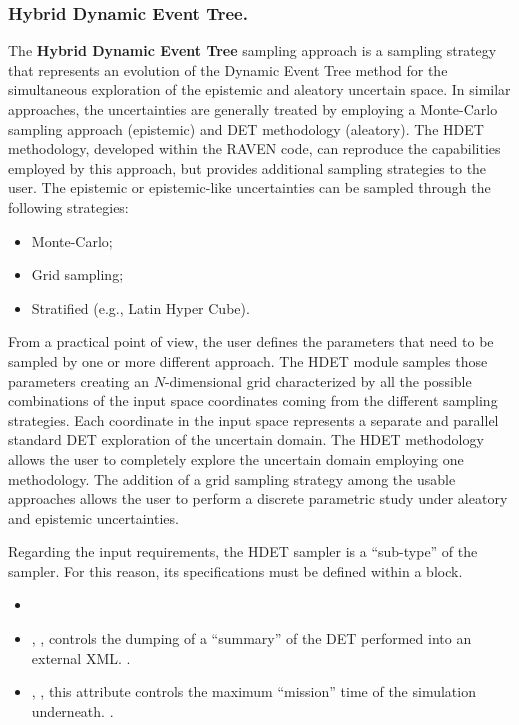 \subsubsection{Hybrid Dynamic Event Tree.}
\label{subsubsubsec:HDET}
The \textbf{Hybrid Dynamic Event Tree} sampling approach is a sampling strategy
that represents an evolution of the Dynamic Event Tree method for the
simultaneous exploration of the epistemic and aleatory uncertain space.
%
In similar approaches, the uncertainties are generally treated by employing a
Monte-Carlo sampling approach (epistemic) and DET methodology (aleatory).
%
The HDET methodology, developed within the RAVEN code, can reproduce the
capabilities employed by this approach, but provides additional sampling
strategies to the user.
%
The epistemic or epistemic-like uncertainties can be sampled through the
following strategies:

\begin{itemize}
  \item Monte-Carlo;
  \item Grid sampling;
  \item Stratified (e.g., Latin Hyper Cube).
\end{itemize}

From a practical point of view, the user defines the parameters that need to be
sampled by one or more different approach.
%
The HDET module samples those parameters creating an $N$-dimensional grid
characterized by all the possible combinations of the input space coordinates
coming from the different sampling strategies.
%
Each coordinate in the input space represents a separate and parallel standard
DET exploration of the uncertain domain.
%
The HDET methodology allows the user to completely explore the uncertain domain
employing one methodology.
%
The addition of a grid sampling strategy among the usable approaches allows the
user to perform a discrete parametric study under aleatory and epistemic
uncertainties.

Regarding the input requirements, the HDET sampler is a ``sub-type'' of the\\
 sampler.
%
For this reason, its specifications must be defined within a
 block.
%
\attrsIntro

\begin{itemize}
  \itemsep0em
  \item \nameDescription
  \item {}, ,
    controls the dumping of a ``summary'' of the DET performed into an external
    XML.
    .
  \item {}, , this
    attribute controls the maximum ``mission'' time of the simulation
    underneath.
    .
\end{itemize}

